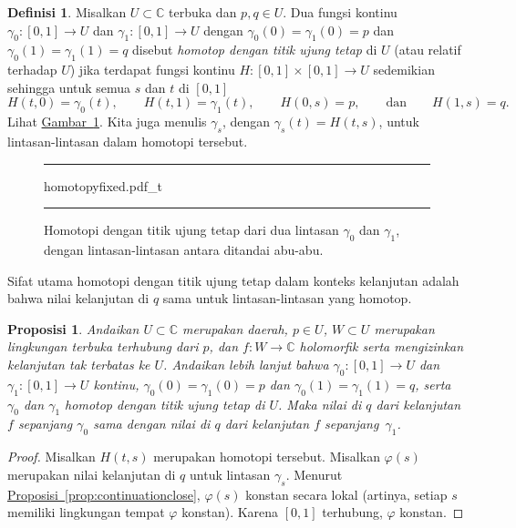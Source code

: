 \documentclass[12pt,openany]{book}
\newcommand{\C}{{\mathbb{C}}}
\newcommand{\myindex}[1]{#1\index{#1}}
\theoremstyle{plain}
\newtheorem{prop}[thm]{Proposisi}
\theoremstyle{remark}
\theoremstyle{definition}
\newtheorem{defn}[thm]{Definisi}
\newenvironment{myfig}{%
\begin{figure}[h!t]
\noindent\rule{\textwidth}{0.5pt}\vspace{12pt}\par\centering}%
{\par\noindent\rule{\textwidth}{0.5pt}
\end{figure}}
\theoremstyle{exercise}
\theoremstyle{example}
\newcommand{\figureref}[1]{\hyperref[#1]{Gambar~\ref*{#1}}}
\newcommand{\propref}[1]{\hyperref[#1]{Proposisi~\ref*{#1}}}
\begin{document}
\begin{defn}
Misalkan $U \subset \C$ terbuka dan $p,q \in U$.
Dua fungsi kontinu
$\gamma_0 \colon [0,1] \to U$ dan
$\gamma_1 \colon [0,1] \to U$ dengan
$\gamma_0(0)=\gamma_1(0)=p$
dan
$\gamma_0(1)=\gamma_1(1)=q$
disebut
\emph{\myindex{homotop dengan titik ujung tetap}} di $U$
(atau relatif terhadap $U$) jika terdapat fungsi kontinu
$H \colon [0,1] \times [0,1] \to U$ sedemikian sehingga
untuk semua $s$ dan $t$ di $[0,1]$
\begin{equation*}
H(t,0) = \gamma_0(t), \qquad
H(t,1) = \gamma_1(t), \qquad
H(0,s) = p, \qquad
\text{dan} \qquad
H(1,s) = q .
\end{equation*}
Lihat \figureref{fig:homotopyfixed}.
Kita juga menulis $\gamma_s$, dengan $\gamma_s(t) = H(t,s)$, untuk lintasan-lintasan dalam homotopi tersebut.
\end{defn}

\begin{myfig}
{homotopyfixed.pdf_t}
\caption{Homotopi dengan titik ujung tetap dari dua lintasan $\gamma_0$ dan
$\gamma_1$, dengan lintasan-lintasan antara ditandai abu-abu.\label{fig:homotopyfixed}}
\end{myfig}

Sifat utama homotopi dengan titik ujung tetap dalam konteks kelanjutan adalah bahwa 
nilai kelanjutan di $q$ sama untuk lintasan-lintasan yang homotop.

\begin{prop}
\pagebreak[2]
Andaikan $U \subset \C$ merupakan daerah,
$p \in U$,
$W \subset U$ merupakan lingkungan terbuka terhubung dari $p$,
dan $f \colon W \to \C$ holomorfik serta mengizinkan kelanjutan tak terbatas
ke $U$.  Andaikan lebih lanjut bahwa
$\gamma_0 \colon [0,1] \to U$ dan
$\gamma_1 \colon [0,1] \to U$ kontinu, $\gamma_0(0)=\gamma_1(0)=p$
dan
$\gamma_0(1)=\gamma_1(1)=q$, serta $\gamma_0$ dan $\gamma_1$ homotop dengan titik ujung
tetap di $U$.
Maka nilai di $q$ dari kelanjutan $f$ sepanjang $\gamma_0$ sama dengan
nilai di $q$ dari kelanjutan $f$ sepanjang~$\gamma_1$.
\end{prop}

\begin{proof}
Misalkan $H(t,s)$ merupakan homotopi tersebut.
Misalkan $\varphi(s)$ merupakan nilai kelanjutan di $q$ untuk lintasan
$\gamma_s$.
Menurut \propref{prop:continuationclose}, $\varphi(s)$ konstan secara lokal (artinya,
setiap $s$ memiliki lingkungan tempat $\varphi$ konstan).  
Karena $[0,1]$ terhubung, $\varphi$ konstan.
\end{proof}
\end{document}
